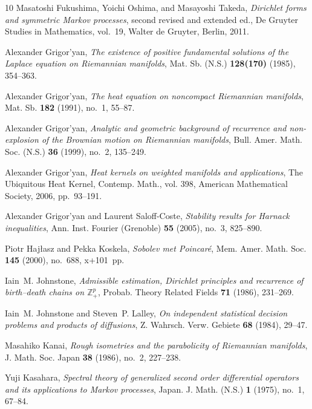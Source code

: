 \documentclass[11pt]{amsart}
\theoremstyle{plain}
\theoremstyle{definition}
\theoremstyle{remark}
\begin{document}
{\begin{thebibliography}{10}
Masatoshi Fukushima, Yoichi Oshima, and Masayoshi Takeda, \emph{Dirichlet
  forms and symmetric {M}arkov processes}, second revised and extended ed.,
  De Gruyter Studies in Mathematics, vol.~19, Walter de Gruyter, Berlin, 2011.

Alexander Grigor'yan, \emph{The existence of positive fundamental solutions
  of the {L}aplace equation on {R}iemannian manifolds}, Mat. Sb. (N.S.)
  \textbf{128(170)} (1985), 354--363.

Alexander Grigor'yan, \emph{The heat equation on noncompact {R}iemannian
  manifolds}, Mat. Sb. \textbf{182} (1991), no.~1, 55--87.

Alexander Grigor'yan, \emph{Analytic and geometric background of recurrence and
  non-explosion of the {B}rownian motion on {R}iemannian manifolds}, Bull.
  Amer. Math. Soc. (N.S.) \textbf{36} (1999), no.~2, 135--249.

Alexander Grigor'yan, \emph{Heat kernels on weighted manifolds and
  applications}, The Ubiquitous Heat Kernel, Contemp. Math., vol. 398,
  American Mathematical Society, 2006, pp.~93--191.

Alexander Grigor'yan and Laurent Saloff-Coste, \emph{Stability results for
  {H}arnack inequalities}, Ann. Inst. Fourier (Grenoble) \textbf{55} (2005),
  no.~3, 825--890.

Piotr Haj{\l}asz and Pekka Koskela, \emph{Sobolev met {P}oincar\'e}, Mem. Amer.
  Math. Soc. \textbf{145} (2000), no.~688, x+101~pp.

Iain~M. Johnstone, \emph{Admissible estimation, {D}irichlet principles and
  recurrence of birth--death chains on {$\mathbb{Z}^p_+$}}, Probab. Theory
  Related Fields \textbf{71} (1986), 231--269.

Iain~M. Johnstone and Steven~P. Lalley, \emph{On independent statistical
  decision problems and products of diffusions}, Z. Wahrsch. Verw. Gebiete
  \textbf{68} (1984), 29--47.

Masahiko Kanai, \emph{Rough isometries and the parabolicity of {R}iemannian
  manifolds}, J. Math. Soc. Japan \textbf{38} (1986), no.~2, 227--238.

Yuji Kasahara, \emph{Spectral theory of generalized second order differential
  operators and its applications to {M}arkov processes}, Japan. J. Math. (N.S.)
  \textbf{1} (1975), no.~1, 67--84.


\end{thebibliography}}
\end{document}
